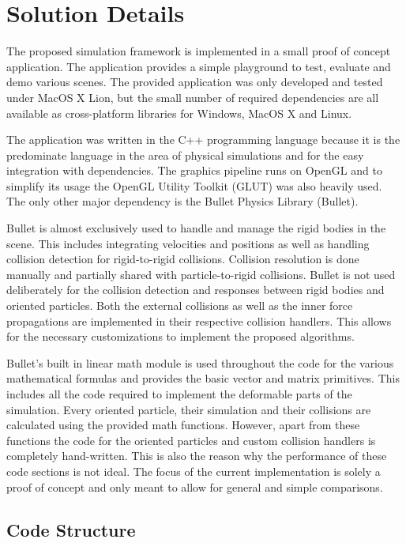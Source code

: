\chapter{Solution Details}
\label{cha:solution_details}

The proposed simulation framework is implemented in a small proof of concept application. The application provides a simple playground to test, evaluate and demo various scenes. The provided application was only developed and tested under MacOS X Lion, but the small number of required dependencies are all available as cross-platform libraries for Windows, MacOS X and Linux. 

The application was written in the C++ programming language because it is the predominate language in the area of physical simulations and for the easy integration with dependencies. The graphics pipeline runs on OpenGL and to simplify its usage the OpenGL Utility Toolkit (GLUT) was also heavily used. The only other major dependency is the Bullet Physics Library (Bullet).

Bullet is almost exclusively used to handle and manage the rigid bodies in the scene. This includes integrating velocities and positions as well as handling collision detection for rigid-to-rigid collisions. Collision resolution is done manually and partially shared with particle-to-rigid collisions. Bullet is not used deliberately for the collision detection and responses between rigid bodies and oriented particles. Both the external collisions as well as the inner force propagations are implemented in their respective collision handlers. This allows for the necessary customizations to implement the proposed algorithms.

Bullet's built in linear math module is used throughout the code for the various mathematical formulas and provides the basic vector and matrix primitives. This includes all the code required to implement the deformable parts of the simulation. Every oriented particle, their simulation and their collisions are calculated using the provided math functions. However, apart from these functions the code for the oriented particles and custom collision handlers is completely hand-written. This is also the reason why the performance of these code sections is not ideal. The focus of the current implementation is solely a proof of concept and only meant to allow for general and simple comparisons.

\section{Code Structure}

